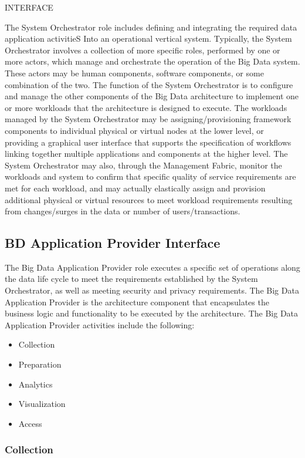 \documentclass[11pt]{article}
\begin{document}
INTERFACE

The System Orchestrator role includes defining and integrating the required data application activitieS 
Into an operational vertical system. Typically, the System Orchestrator involves a collection of more 
specific roles, performed by one or more actors, which manage and orchestrate the operation of the Big 
Data system. These actors may be human components, software components, or some combination of the 
two. The function of the System Orchestrator is to configure and manage the other components of the Big 
Data architecture to implement one or more workloads that the architecture is designed to execute. The 
workloads managed by the System Orchestrator may be assigning/provisioning framework components to 
individual physical or virtual nodes at the lower level, or providing a graphical user interface that supports 
the specification of workflows linking together multiple applications and components at the higher level. 
The System Orchestrator may also, through the Management Fabric, monitor the workloads and system to 
confirm that specific quality of service requirements are met for each workload, and may actually 
elastically assign and provision additional physical or virtual resources to meet workload requirements 
resulting from changes/surges in the data or number of users/transactions.

\subsection{BD Application Provider Interface}

The Big Data Application Provider role executes a specific set of operations along the data life cycle to 
meet the requirements established by the System Orchestrator, as well as meeting security and privacy 
requirements. The Big Data Application Provider is the architecture component that encapsulates the 
business logic and functionality to be executed by the architecture. The Big Data Application Provider 
activities include the following:

\begin{itemize}
\item	Collection
\item	Preparation
\item	Analytics
\item	Visualization
\item	Access
\end{itemize}


\subsubsection{Collection}
\end{document}
